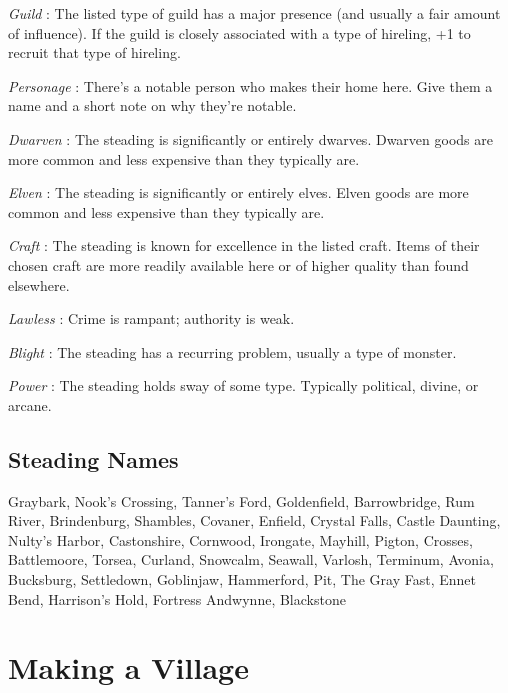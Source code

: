 \emph{Guild}
: The listed type of guild has a major presence (and usually a fair amount of influence). If the guild is closely associated with a type of hireling, +1 to recruit that type of hireling.


\emph{Personage}
: There's a notable person who makes their home here. Give them a name and a short note on why they're notable.


\emph{Dwarven}
: The steading is significantly or entirely dwarves. Dwarven goods are more common and less expensive than they typically are.


\emph{Elven}
: The steading is significantly or entirely elves. Elven goods are more common and less expensive than they typically are.


\emph{Craft}
: The steading is known for excellence in the listed craft. Items of their chosen craft are more readily available here or of higher quality than found elsewhere. 


\emph{Lawless}
: Crime is rampant; authority is weak.


\emph{Blight}
: The steading has a recurring problem, usually a type of monster.


\emph{Power}
: The steading holds sway of some type. Typically political, divine, or arcane.
\subsection{Steading Names}


Graybark, Nook's Crossing, Tanner's Ford, Goldenfield, Barrowbridge, Rum River, Brindenburg, Shambles, Covaner, Enfield, Crystal Falls, Castle Daunting, Nulty's Harbor, Castonshire, Cornwood, Irongate, Mayhill, Pigton, Crosses, Battlemoore, Torsea, Curland, Snowcalm, Seawall, Varlosh, Terminum, Avonia, Bucksburg, Settledown, Goblinjaw, Hammerford, Pit, The Gray Fast, Ennet Bend, Harrison's Hold, Fortress Andwynne, Blackstone
\section*{Making a Village}


